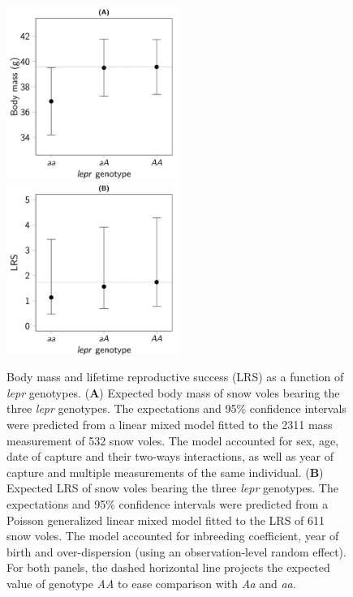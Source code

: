 \begin{figure}[ht]
	\includegraphics[width=0.5\textwidth]{FiguresGeneral/PhenoEffect-1}
	\includegraphics[width=0.5\textwidth]{FiguresGeneral/FitnessEffect-1}
	\caption{Body mass and lifetime reproductive success (LRS) as a function of \emph{lepr} genotypes. 
	(\textbf{A}) Expected body mass of snow voles bearing the three \emph{lepr} genotypes. The expectations and 95\% confidence intervals were predicted from a linear mixed model fitted to the 2311 mass measurement of 532 snow voles. The model accounted for sex, age, date of capture and their two-ways interactions, as well as year of capture and multiple measurements of the same individual.
	(\textbf{B}) Expected LRS of snow voles bearing the three \emph{lepr} genotypes. The expectations and 95\% confidence intervals were predicted from a Poisson generalized linear mixed model fitted to the LRS of 611 snow voles. The model accounted for inbreeding coefficient, year of birth and over-dispersion (using an observation-level random effect). For both panels, the dashed horizontal line projects the expected value of genotype \emph{AA} to ease comparison with \emph{Aa} and \emph{aa}.}
	\label{fig:leprpheno}
\end{figure}

